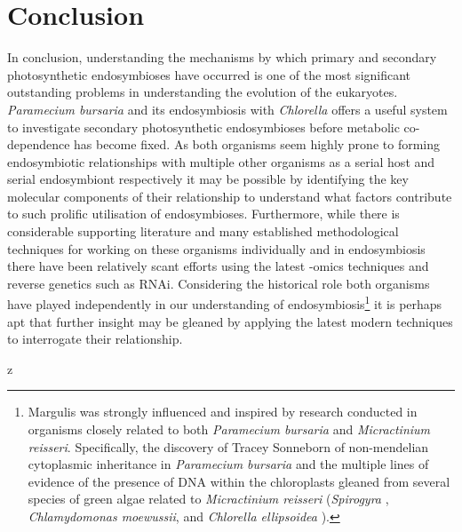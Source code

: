 \section{Conclusion}
In conclusion, understanding the mechanisms by which primary and secondary photosynthetic endosymbioses have occurred is one of the most significant
outstanding problems in understanding the evolution of the eukaryotes. \textit{Paramecium bursaria} and its endosymbiosis with \textit{Chlorella}
offers a useful system to investigate secondary photosynthetic endosymbioses before metabolic co-dependence has become fixed.  
As both organisms seem highly prone to forming endosymbiotic relationships with multiple other organisms as a serial host and serial endosymbiont
respectively it may be possible by identifying the key molecular components of their relationship to understand what factors contribute to such
prolific utilisation of endosymbioses.  Furthermore, while there is considerable supporting literature and many established methodological techniques
for working on these organisms individually and in endosymbiosis there have been relatively scant efforts using the latest -omics techniques 
and reverse genetics such as RNAi.
Considering the historical role both organisms have played independently in our understanding of endosymbiosis\footnote{Margulis was 
    strongly influenced and inspired by research conducted
in organisms closely related to both \textit{Paramecium bursaria} and 
\textit{Micractinium reisseri}. Specifically, the discovery of Tracey Sonneborn
of non-mendelian cytoplasmic inheritance in \textit{Paramecium bursaria} \citep{Sonneborn1950}
and the multiple lines of evidence of the presence of DNA within the chloroplasts
gleaned from several species of green algae related to \textit{Micractinium reisseri}
(\textit{Spirogyra} \citep{Stocking1959}, \textit{Chlamydomonas moewussii}, and 
\textit{Chlorella ellipsoidea} \cite{Ris1962}).} it is perhaps apt that further insight may be gleaned by applying the latest modern 
techniques to interrogate their relationship.

z
